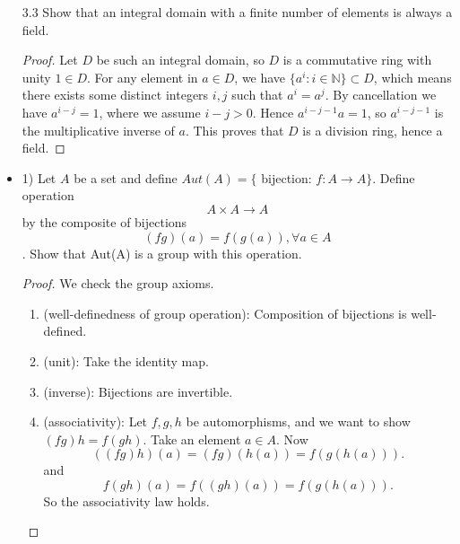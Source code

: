 \begin{itemize}
\begin{proof}
	Now consider $S = \text{span}(\beta_1, \beta_2) = K\beta_1 + K\beta_2$.
	Since $K$ is infinite, $S$ is infinite and yet $S \subset \bigcup_{i = 1} ^n U_i$. Hence by pigeonhole principle there exists distinct $s_1, s_2 \in S$ and $i \in \{1, \ldots, n\} $ such that $s_1, s_2 \in U_i$. But this implies, by algebraic closure of linear subspace, that $S \subset U_i$, and in particular, $\beta_1, \beta_2 \in U_i$, a contradiction. 
\end{proof}

	\item [3.3] Show that an integral domain with a finite number of elements is always a field.
\begin{proof}
	Let $D$ be such an integral domain, so $D$ is a commutative ring with unity $1 \in D$. For any element in $a \in D$, we have $\{a^i: i \in \mathbb{N}\} \subset   D$, which means there exists some distinct integers $i, j$ such that $a^i = a^j$. By cancellation we have  $a^{i - j} = 1$, where we assume $i - j > 0$.  Hence $a^{i - j - 1} a =  1$, so $a^{i - j - 1}$ is the multiplicative inverse of $a$. This proves that $D$ is a division ring, hence a field. 
\end{proof}
\item 1) Let $A$ be a set and define $A u t(A)=\{$ bijection: $f: A \rightarrow A\}$. Define operation
\[
A \times A \rightarrow A
\]
by the composite of bijections
\[
(f g)(a)=f(g(a)), \forall a \in A
\]
. Show that Aut(A) is a group with this operation.
\begin{proof}
	We check the group axioms.
	\begin{enumerate}
		\item (well-definedness of group operation): Composition of bijections is well-defined.
		\item (unit): Take the identity map.
		\item (inverse): Bijections are invertible.
		\item (associativity): Let $f, g, h$ be automorphisms, and we want to show $(fg) h = f(gh)$. Take an element $a \in A$. Now
			\[
				\left((fg)h\right)(a) = (fg)\left(h(a)\right) = f\left( g\left( h(a) \right)  \right) 
			.\] 
and
\[
	f(gh)(a) = f\left( (gh) (a) \right)  = f\left( g\left( h(a) \right)  \right) 
.\] 
So the associativity law holds.
	\end{enumerate}
\end{proof}


\end{itemize}
